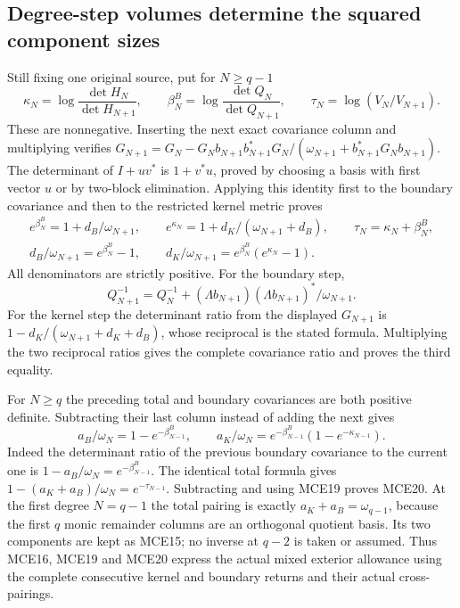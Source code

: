 \documentclass[11pt,a4paper]{article}
\begin{document}
\subsection{Degree-step volumes determine the squared component sizes}
Still fixing one original source, put for $N\ge q-1$
\[
 \kappa_N=\log\frac{\det H_N}{\det H_{N+1}},\qquad
 \beta_N^B=\log\frac{\det Q_N}{\det Q_{N+1}},\qquad
 \tau_N=\log(V_N/V_{N+1}).
 \tag{MCE18}
\]
These are nonnegative. Inserting the next exact covariance column
and multiplying verifies
$G_{N+1}=G_N-G_Nb_{N+1}b_{N+1}^*G_N/
(\omega_{N+1}+b_{N+1}^*G_Nb_{N+1})$.
The determinant of $I+uv^*$ is $1+v^*u$, proved by choosing
a basis with first vector $u$ or by two-block elimination.
Applying this identity first to the boundary covariance and then
to the restricted kernel metric proves
\[
 \begin{gathered}
 e^{\beta_N^B}=1+d_B/\omega_{N+1},\qquad
 e^{\kappa_N}=1+d_K/(\omega_{N+1}+d_B),\qquad
 \tau_N=\kappa_N+\beta_N^B,\\
 d_B/\omega_{N+1}=e^{\beta_N^B}-1,\qquad
 d_K/\omega_{N+1}=e^{\beta_N^B}(e^{\kappa_N}-1).
 \end{gathered}\tag{MCE19}
\]
All denominators are strictly positive. For the boundary step,
\[
 Q_{N+1}^{-1}=Q_N^{-1}
       +(\Lambda b_{N+1})(\Lambda b_{N+1})^*/\omega_{N+1}.
\]
For the kernel step the determinant ratio from the displayed
$G_{N+1}$ is
$1-d_K/(\omega_{N+1}+d_K+d_B)$, whose reciprocal is the stated
formula. Multiplying the two reciprocal ratios gives the complete
covariance ratio and proves the third equality.

For $N\ge q$ the preceding total and boundary covariances are
both positive definite. Subtracting their last column instead of
adding the next gives
\[
 a_B/\omega_N=1-e^{-\beta_{N-1}^B},\qquad
 a_K/\omega_N=e^{-\beta_{N-1}^B}(1-e^{-\kappa_{N-1}}).
 \tag{MCE20}
\]
Indeed the determinant ratio of the previous boundary covariance
to the current one is $1-a_B/\omega_N=e^{-\beta_{N-1}^B}$.
The identical total formula gives
$1-(a_K+a_B)/\omega_N=e^{-\tau_{N-1}}$.
Subtracting and using MCE19 proves MCE20. At the first degree
$N=q-1$ the total pairing is exactly $a_K+a_B=\omega_{q-1}$,
because the first $q$ monic remainder columns are an orthogonal
quotient basis. Its two components are kept as MCE15; no inverse
at $q-2$ is taken or assumed. Thus MCE16, MCE19 and MCE20 express
the actual mixed exterior allowance using the complete consecutive
kernel and boundary returns and their actual cross-pairings.
\end{document}

